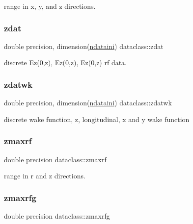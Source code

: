 range in x, y, and z directions. 

\mbox{\label{namespacedataclass_aeed47a37719b1f84d885a1cb8a962081}} 
\subsubsection{\texorpdfstring{zdat}{zdat}}
{\footnotesize\ttfamily double precision, dimension(\mbox{\hyperlink{namespacedataclass_a2578bbe9c4dc0892ee08a8619cd7e978}{ndataini}}) dataclass\+::zdat}



discrete Ez(0,z), Ez\textquotesingle{}(0,z), Ez\textquotesingle{}\textquotesingle{}(0,z) rf data. 

\mbox{\label{namespacedataclass_aedbb605bbae521fa94b55a592eaf5802}} 
\subsubsection{\texorpdfstring{zdatwk}{zdatwk}}
{\footnotesize\ttfamily double precision, dimension(\mbox{\hyperlink{namespacedataclass_a2578bbe9c4dc0892ee08a8619cd7e978}{ndataini}}) dataclass\+::zdatwk}



discrete wake function, z, longitudinal, x and y wake function 

\mbox{\label{namespacedataclass_a4646788256b1b461413c546d6df8ee88}} 
\subsubsection{\texorpdfstring{zmaxrf}{zmaxrf}}
{\footnotesize\ttfamily double precision dataclass\+::zmaxrf}



range in r and z directions. 

\mbox{\label{namespacedataclass_a52b6a1ee39c205fce4ef2be72ab153aa}} 
\subsubsection{\texorpdfstring{zmaxrfg}{zmaxrfg}}
{\footnotesize\ttfamily double precision dataclass\+::zmaxrfg}



